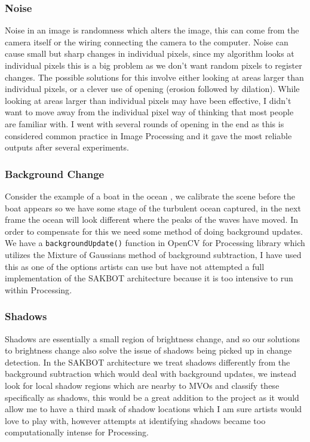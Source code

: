 \documentclass[a4paper]{report}
\begin{document}
\subsubsection{Noise}
Noise in an image is randomness which alters the image, this can come from the camera itself or the wiring connecting the camera to the computer. Noise can cause small but sharp changes in individual pixels, since my algorithm looks at individual pixels this is a big problem as we don't want random pixels to register changes. The possible solutions for this involve either looking at areas larger than individual pixels, or a clever use of opening (erosion followed by dilation). While looking at areas larger than individual pixels may have been effective, I didn't want to move away from the individual pixel way of thinking that most people are familiar with. I went with several rounds of opening in the end as this is considered common practice in Image Processing and it gave the most reliable outputs after several experiments.

\subsubsection{Background Change}
Consider the example of a boat in the ocean , we calibrate the scene before the boat appears so we have some stage of the turbulent ocean captured, in the next frame the ocean will look different where the peaks of the waves have moved. In order to compensate for this we need some method of doing background updates. We have a \verb|backgroundUpdate()| function in OpenCV for Processing library\cite{OPENCV} which utilizes the Mixture of Gaussians method of background subtraction, I have used this as one of the options artists can use but have not attempted a full implementation of the SAKBOT architecture\cite{SAKBOT} because it is too intensive to run within Processing\cite{PROCESSING}.

\subsubsection{Shadows}
Shadows are essentially a small region of brightness change, and so our solutions to brightness change also solve the issue of shadows being picked up in change detection. In the SAKBOT architecture\cite{SAKBOT} we treat shadows differently from the background subtraction which would deal with background updates, we instead look for local shadow regions which are nearby to MVOs and classify these specifically as shadows, this would be a great addition to the project as it would allow me to have a third mask of shadow locations which I am sure artists would love to play with, however attempts at identifying shadows became too computationally intense for Processing\cite{PROCESSING}.
\end{document}
